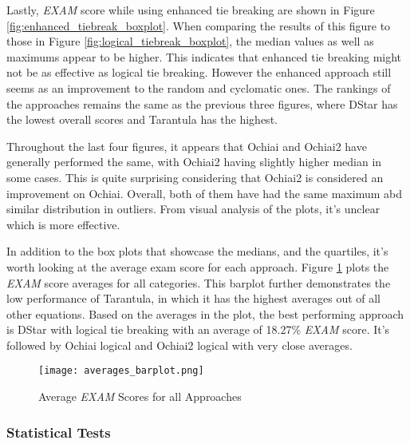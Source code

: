 Lastly, \emph{EXAM} score while using enhanced tie breaking are shown in Figure
\ref{fig:enhanced_tiebreak_boxplot}. When comparing the results of this figure
to those in Figure \ref{fig:logical_tiebreak_boxplot}, the median values as well
as maximums appear to be higher. This indicates that enhanced tie breaking might
not be as effective as logical tie breaking. However the enhanced approach still
seems as an improvement to the random and cyclomatic ones. The rankings of the
approaches remains the same as the previous three figures, where DStar has the
lowest overall scores and Tarantula has the highest.

Throughout the last four figures, it appears that Ochiai and Ochiai2 have
generally performed the same, with Ochiai2 having slightly higher median in some
cases. This is quite surprising considering that Ochiai2 is considered an
improvement on Ochiai. Overall, both of them have had the same maximum abd
similar distribution in outliers. From visual analysis of the plots, it's
unclear which is more effective.

In addition to the box plots that showcase the medians, and the quartiles, it's
worth looking at the average exam score for each approach. Figure
\ref{fig:averages_barplot} plots the \emph{EXAM} score averages for all
categories. This barplot further demonstrates the low performance of Tarantula,
in which it has the highest averages out of all other equations. Based on the
averages in the plot, the best performing approach is DStar with logical tie
breaking with an average of 18.27\% \emph{EXAM} score. It's followed by Ochiai
logical and Ochiai2 logical with very close averages.

\begin{figure}[!htb]
	\begin{center}
		\texttt{[image: averages\_barplot.png]}
        \caption{\label{fig:averages_barplot} Average \emph{EXAM} Scores for all
        Approaches}
	\end{center}
\end{figure}

\subsubsection{Statistical Tests}
\label{subsubsec:statistical_test}

